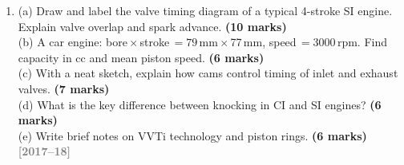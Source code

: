 \documentclass[12pt,a3paper]{article}
\newcommand{\yr}[1]{\hfill\textcolor{gray}{\small\textbf{[#1]}}}
\newcommand{\mk}[1]{\textcolor{orange!70!black}{\small\textbf{(#1 marks)}}}
\newcommand{\variant}[1]{\par\vspace{1pt}\textcolor{blue!50!black}%
  {\footnotesize\textit{$\hookrightarrow$ Similar: #1}}}
\begin{document}
\begin{enumerate}
\begin{tcolorbox}[enhanced,breakable,ansbox,colback=cB!4,colframe=cB,
  boxrule=0.8pt,arc=5pt,
  title={\textbf{Answer}},fonttitle=\bfseries\color{white},colbacktitle=cB]
\hrulefill

\textbf{Part (b): Cam-Operated Valve Diagram}

\variant{A2-Q14(c) — same sketch given there}

\hrulefill

\textbf{Part (c): Diesel Cycle — Numerical Solution}

\textbf{Given:}
$P_1 = 0.1\,\text{MPa}$,\;
$T_1 = 313\,\text{K}$,\;
$r = 15$,\;
$q_{\text{in}} = 1675\,\text{kJ/kg}$,\;
$C_v = 0.718\,\text{kJ/kgK}$,\;
$C_p = 1.005\,\text{kJ/kgK}$,\;
$k = C_p/C_v = 1.4$

\medskip
\textbf{State 2 — end of isentropic compression:}
\[
  T_2 = T_1 r^{k-1} = 313\times15^{0.4} = 313\times3.042 \approx 952\,\text{K}
\]
\[
  P_2 = P_1 r^k = 0.1\times15^{1.4} = 0.1\times44.31 \approx 4.43\,\text{MPa}
\]

\textbf{(v) Cut-off ratio and (i) Maximum temperature:}
\[
  q_{\text{in}} = C_p(T_3 - T_2)
  \implies T_3 = T_2 + \frac{q_{\text{in}}}{C_p}
  = 952 + \frac{1675}{1.005} \approx \boxed{T_3 = 2618\,\text{K}}
\]
\[
  r_c = \frac{T_3}{T_2} = \frac{2618}{952} \approx \boxed{2.75}
\]

\textbf{(iv) Temperature at end of isentropic expansion (State 4):}
\[
  T_4 = T_3\left(\frac{r_c}{r}\right)^{k-1}
  = 2618\times\left(\frac{2.75}{15}\right)^{0.4}
  = 2618\times(0.1833)^{0.4}
  \approx 2618\times0.510
  \approx \boxed{1335\,\text{K}}
\]

\textbf{Heat rejected and (ii) Net work:}
\[
  q_{\text{out}} = C_v(T_4 - T_1) = 0.718\times(1335-313) = 0.718\times1022
  \approx 734\,\text{kJ/kg}
\]
\[
  \boxed{w_{\text{net}} = 1675 - 734 = 941\,\text{kJ/kg}}
\]

\textbf{(iii) Cycle efficiency:}
\[
  \eta = \frac{w_{\text{net}}}{q_{\text{in}}} = \frac{941}{1675}
  \approx \boxed{56.2\%}
\]

\end{tcolorbox}

\item \label{qlabel:A2-Q13}
(a) Draw and label the valve timing diagram of a typical 4-stroke SI engine. Explain valve overlap and spark advance. \mk{10}\\
(b) A car engine: bore\,$\times$\,stroke\,$= 79$\,mm\,$\times$\,77\,mm, speed\,$= 3000$\,rpm. Find capacity in cc and mean piston speed. \mk{6}\\
(c) With a neat sketch, explain how cams control timing of inlet and exhaust valves. \mk{7}\\
(d) What is the key difference between knocking in CI and SI engines? \mk{6}\\
(e) Write brief notes on VVTi technology and piston rings. \mk{6}
\yr{2017--18}


\end{enumerate}
\end{document}
